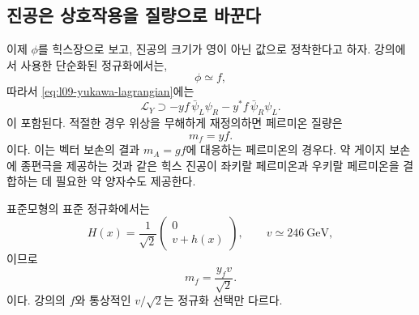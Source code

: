 \subsection{진공은 상호작용을 질량으로 바꾼다}

이제 \(\phi\)를 힉스장으로 보고, 진공의 크기가 영이 아닌 값으로 정착한다고 하자. 강의에서 사용한 단순화된 정규화에서는,
\begin{equation}
  \phi\simeq f,
\end{equation}
따라서 \eqref{eq:l09-yukawa-lagrangian}에는
\begin{equation}
  \mathcal L_Y
  \supset
  -yf\,\bar\psi_L\psi_R
  -y^*f\,\bar\psi_R\psi_L .
\end{equation}
이 포함된다. 적절한 경우 위상을 무해하게 재정의하면 페르미온 질량은
\begin{equation}
  m_f=yf.
  \label{eq:l09-lecture-fermion-mass}
\end{equation}
이다. 이는 벡터 보손의 결과 \(m_A=gf\)에 대응하는 페르미온의 경우다. 약 게이지 보손에 종편극을 제공하는 것과 같은 힉스 진공이 좌키랄 페르미온과 우키랄 페르미온을 결합하는 데 필요한 약 양자수도 제공한다.

표준모형의 표준 정규화에서는
\begin{equation}
  H(x)=\frac1{\sqrt2}
  \begin{pmatrix}
    0\\ v+h(x)
  \end{pmatrix},
  \qquad v\simeq246\ \mathrm{GeV},
  \label{eq:l09-sm-higgs-vacuum}
\end{equation}
이므로
\begin{equation}
  m_f=\frac{y_fv}{\sqrt2}.
  \label{eq:l09-sm-fermion-mass}
\end{equation}
이다. 강의의 \(f\)와 통상적인 \(v/\sqrt2\)는 정규화 선택만 다르다.

\begin{classroomqa}\end{classroomqa}

\begin{classroomqa}\end{classroomqa}

